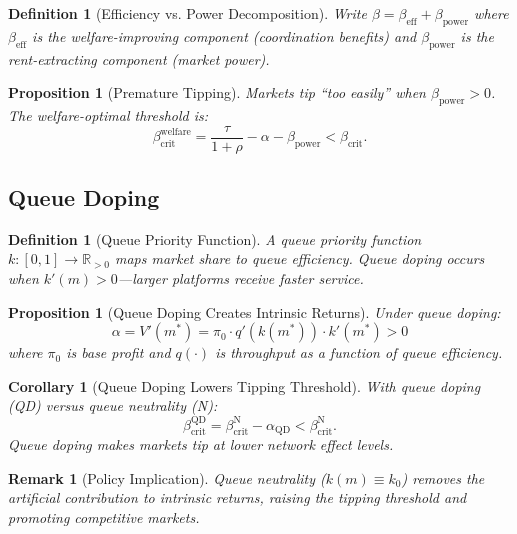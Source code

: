\documentclass[12pt]{article}
\newtheorem{proposition}[theorem]{Proposition}
\newtheorem{corollary}[theorem]{Corollary}
\newtheorem{definition}[theorem]{Definition}
\newtheorem{remark}{Remark}[section]
\newcommand{\R}{\mathbb{R}}
\begin{document}
\begin{definition}[Efficiency vs. Power Decomposition]
Write $\beta = \beta_{\mathrm{eff}} + \beta_{\mathrm{power}}$ where $\beta_{\mathrm{eff}}$ is the welfare-improving component (coordination benefits) and $\beta_{\mathrm{power}}$ is the rent-extracting component (market power).
\end{definition}

\begin{proposition}[Premature Tipping]
Markets tip ``too easily'' when $\beta_{\mathrm{power}} > 0$. The welfare-optimal threshold is:
\[
\beta_{\mathrm{crit}}^{\mathrm{welfare}} = \frac{\tau}{1 + \rho} - \alpha - \beta_{\mathrm{power}} < \beta_{\mathrm{crit}}.
\]
\end{proposition}

\subsection{Queue Doping}

\begin{definition}[Queue Priority Function]
A \emph{queue priority function} $k: [0, 1] \to \R_{>0}$ maps market share to queue efficiency. \emph{Queue doping} occurs when $k'(m) > 0$---larger platforms receive faster service.
\end{definition}

\begin{proposition}[Queue Doping Creates Intrinsic Returns]
\label{prop:queue-doping}
Under queue doping:
\[
\alpha = V'(m^*) = \pi_0 \cdot q'(k(m^*)) \cdot k'(m^*) > 0
\]
where $\pi_0$ is base profit and $q(\cdot)$ is throughput as a function of queue efficiency.
\end{proposition}

\begin{corollary}[Queue Doping Lowers Tipping Threshold]
\label{cor:queue-threshold}
With queue doping (QD) versus queue neutrality (N):
\[
\beta_{\mathrm{crit}}^{\mathrm{QD}} = \beta_{\mathrm{crit}}^{\mathrm{N}} - \alpha_{\mathrm{QD}} < \beta_{\mathrm{crit}}^{\mathrm{N}}.
\]
Queue doping makes markets tip at lower network effect levels.
\end{corollary}

\begin{remark}[Policy Implication]
Queue neutrality ($k(m) \equiv k_0$) removes the artificial contribution to intrinsic returns, raising the tipping threshold and promoting competitive markets.
\end{remark}
\end{document}
